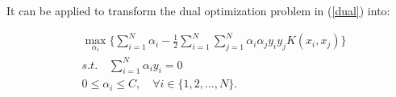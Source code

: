 It can be applied to transform the dual optimization problem in (\ref{dual}) into:

\begin{equation}\label{kernalsvm}
	\begin{split}
		& \mathop{\max}\limits_{\alpha_i}\{\sum\limits_{i=1}^N\alpha_i
		-\frac{1}{2}\sum\limits_{i=1}^N\sum\limits_{j=1}^N\alpha_i\alpha_jy_iy_jK(x_i,x_j)\}\\
		& s.t. \quad \sum\limits_{i=1}^N\alpha_iy_i = 0\\
		&0\le\alpha_i\le C,\quad\forall i\in \{1,2,...,N\}.\\
	\end{split}
\end{equation}